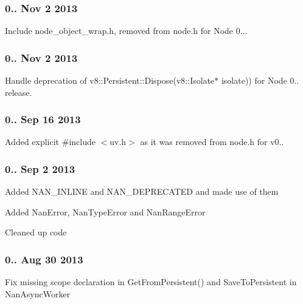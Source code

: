 \subsubsection*{0.. Nov 2 2013}


\begin{DoxyItemize}
\item Include node\+\_\+object\+\_\+wrap.\+h, removed from node.\+h for Node 0...
\end{DoxyItemize}

\subsubsection*{0.. Nov 2 2013}


\begin{DoxyItemize}
\item Handle deprecation of v8\+::\+Persistent\+::\+Dispose(v8\+::\+Isolate$\ast$ isolate)) for Node 0.. release.
\end{DoxyItemize}

\subsubsection*{0.. Sep 16 2013}


\begin{DoxyItemize}
\item Added explicit {\ttfamily \#include $<$uv.\+h$>$} as it was removed from node.\+h for v0..
\end{DoxyItemize}

\subsubsection*{0.. Sep 2 2013}


\begin{DoxyItemize}
\item Added N\+A\+N\+\_\+\+I\+N\+L\+I\+NE and N\+A\+N\+\_\+\+D\+E\+P\+R\+E\+C\+A\+T\+ED and made use of them
\item Added Nan\+Error, Nan\+Type\+Error and Nan\+Range\+Error
\item Cleaned up code
\end{DoxyItemize}

\subsubsection*{0.. Aug 30 2013}


\begin{DoxyItemize}
\item Fix missing scope declaration in Get\+From\+Persistent() and Save\+To\+Persistent in Nan\+Async\+Worker
\end{DoxyItemize}

